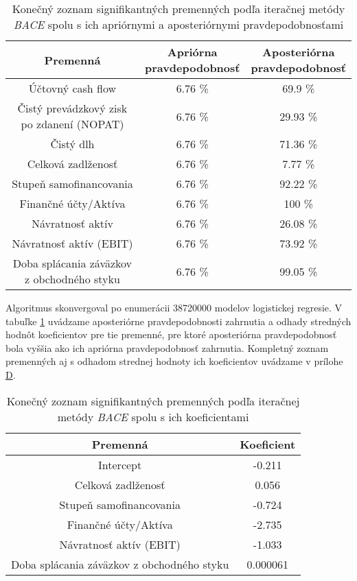 \begin{table}
    \begin{tabular}{ |c|c|c| }
        \hline
        Premenná & \makecell{Apriórna \\ pravdepodobnosť} & \makecell{Aposteriórna \\ pravdepodobnosť} \\
        \hline
        Účtovný cash flow & 6.76 \% & 69.9 \% \\
        \hline
        Čistý prevádzkový zisk po zdanení (NOPAT) & 6.76 \% & 29.93 \% \\
        \hline
        Čistý dlh & 6.76 \% & 71.36 \% \\
        \hline
        Celková zadlženosť & 6.76 \% & 7.77 \% \\
        \hline
        Stupeň samofinancovania & 6.76 \% & 92.22 \% \\
        \hline
        Finančné účty/Aktíva & 6.76 \% & 100 \% \\
        \hline
        Návratnosť aktív & 6.76 \% & 26.08 \%\\
        \hline
        Návratnosť aktív (EBIT) & 6.76 \% & 73.92 \% \\
        \hline
        Doba splácania záväzkov z obchodného styku & 6.76 \% & 99.05 \% \\
        \hline
    \end{tabular}
    \caption{Konečný zoznam signifikantných premenných podľa iteračnej metódy \emph{BACE} spolu s ich apriórnymi a aposteriórnymi pravdepodobnosťami}
    \label{bace2 tabulka pp}
\end{table}

Algoritmus skonvergoval po enumerácii 38720000 modelov logistickej regresie.
V tabuľke \ref{bace2 tabulka pp} uvádzame aposteriórne pravdepodobnosti zahrnutia a odhady stredných hodnôt koeficientov pre tie premenné,
pre ktoré aposteriórna pravdepodobnosť bola vyššia ako ich apriórna pravdepodobnosť zahrnutia.
Kompletný zoznam premenných aj s odhadom strednej hodnoty ich koeficientov uvádzame v prílohe \hyperref[appendix:d]{D}.

\begin{table}
    \begin{tabular}{ |c|c| }
        \hline
        Premenná & Koeficient \\
        \hline
        Intercept & -0.211 \\
        \hline
        Celková zadlženosť & 0.056 \\
        \hline
        Stupeň samofinancovania & -0.724 \\
        \hline
        Finančné účty/Aktíva & -2.735 \\
        \hline
        Návratnosť aktív (EBIT) & -1.033 \\
        \hline
        Doba splácania záväzkov z obchodného styku & 0.000061 \\
        \hline
    \end{tabular}
    \caption{Konečný zoznam signifikantných premenných podľa iteračnej metódy \emph{BACE} spolu s ich koeficientami}
    \label{bace2 tabulka konecne parametre}
\end{table}

